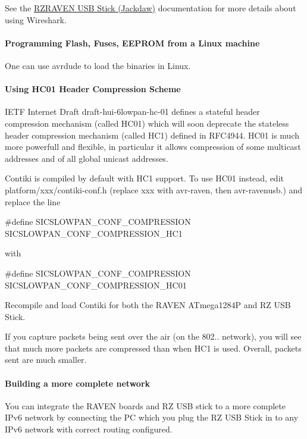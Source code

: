 \-See the \hyperlink{a00053}{\-R\-Z\-R\-A\-V\-E\-N \-U\-S\-B \-Stick (\-Jackdaw)} documentation for more details about using \-Wireshark.\hypertarget{a00058_adavanced_linux}{}\paragraph{\-Programming Flash, Fuses, E\-E\-P\-R\-O\-M from a Linux machine}\label{a00058_adavanced_linux}
\-One can use avrdude to load the binaries in \-Linux.\hypertarget{a00058_advanced_hc01}{}\paragraph{\-Using H\-C01 Header Compression Scheme}\label{a00058_advanced_hc01}
\-I\-E\-T\-F \-Internet \-Draft draft-\/hui-\/6lowpan-\/hc-\/01 defines a stateful header compression mechanism (called \-H\-C01) which will soon deprecate the stateless header compression mechanism (called \-H\-C1) defined in \-R\-F\-C4944. \-H\-C01 is much more powerfull and flexible, in particular it allows compression of some multicast addresses and of all global unicast addresses.

\-Contiki is compiled by default with \-H\-C1 support. \-To use \-H\-C01 instead, edit platform/xxx/contiki-\/conf.\-h (replace xxx with avr-\/raven, then avr-\/ravenusb.) and replace the line\par
 
\begin{DoxyCode}
#define SICSLOWPAN_CONF_COMPRESSION SICSLOWPAN_CONF_COMPRESSION_HC1
\end{DoxyCode}
 with 
\begin{DoxyCode}
#define SICSLOWPAN_CONF_COMPRESSION SICSLOWPAN_CONF_COMPRESSION_HC01
\end{DoxyCode}


\-Recompile and load \-Contiki for both the \-R\-A\-V\-E\-N \-A\-Tmega1284\-P and \-R\-Z \-U\-S\-B \-Stick.

\-If you capture packets being sent over the air (on the 802.. network), you will see that much more packets are compressed than when \-H\-C1 is used. \-Overall, packets sent are much smaller.\hypertarget{a00058_advanced_network}{}\paragraph{\-Building a more complete network}\label{a00058_advanced_network}
\-You can integrate the \-R\-A\-V\-E\-N boards and \-R\-Z \-U\-S\-B stick to a more complete \-I\-Pv6 network by connecting the \-P\-C which you plug the \-R\-Z \-U\-S\-B \-Stick in to any \-I\-Pv6 network with correct routing configured.

